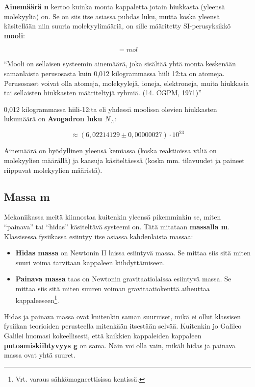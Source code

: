 \documentclass[12pt,a4paper,finnish]{book}
\begin{document}
\textbf{Ainemäärä n} kertoo kuinka monta kappaletta jotain hiukkasta (yleensä molekyylia) on. Se on siis itse 
asiassa puhdas luku, mutta koska yleensä käsitellään niin suuria molekyylimääriä, on sille määritetty 
SI-perusyksikkö \textbf{mooli}:

\begin{equation}
 [n] = mol
\end{equation}

``Mooli on sellaisen systeemin ainemäärä, joka sisältää yhtä monta keskenään samanlaista perusosasta kuin 0,012 
kilogrammassa hiili 12:ta on atomeja. Perusosaset voivat olla atomeja, molekyylejä, ioneja, elektroneja,
muita hiukkasia tai sellaisten hiukkasten määriteltyjä ryhmiä. (14. CGPM, 1971)''

0,012 kilogrammassa hiili-12:ta eli yhdessä moolissa olevien hiukkasten lukumäärä on \textbf{Avogadron luku $N_A$}:

\begin{equation}
 [N_A] \approx (6,02214129 \pm 0,00000027)\cdot10^{23}
\end{equation}

Ainemäärä on hyödyllinen yleensä kemiassa (koska reaktioissa väliä on molekyylien määrällä) ja kaasuja käsiteltäessä 
(koska mm. tilavuudet ja paineet riippuvat molekyylien määristä).

\subsection{Massa m}

Mekaniikassa meitä kiinnostaa kuitenkin yleensä pikemminkin se, miten ``painava'' tai ``hidas'' käsiteltävä systeemi 
on. Tätä mitataan \textbf{massalla m}. Klassisessa fysiikassa esiintyy itse asiassa kahdenlaista massaa:

\begin{itemize}
 \item \textbf{Hidas massa} on Newtonin II laissa esiintyvä massa. Se mittaa siis sitä miten suuri voima tarvitaan 
 kappaleen kiihdyttämiseen.
 \item \textbf{Painava massa} taas on Newtonin gravitaatiolaissa esiintyvä massa. Se mittaa siis sitä miten suuren 
 voiman gravitaatiokenttä aiheuttaa kappaleeseen\footnote{Vrt. varaus sähkömagneettisissa kentissä.}.
\end{itemize}

Hidas ja painava massa ovat kuitenkin saman suuruiset, mikä ei ollut klassisen fysiikan teorioiden perusteella  
mitenkään itsestään selvää. Kuitenkin jo Galileo Galilei huomasi kokeellisesti, että kaikkien kappaleiden 
kappaleen \textbf{putoamiskiihtyvyys g} on sama. Näin voi olla vain, mikäli hidas ja painava massa ovat yhtä suuret.
\end{document}
